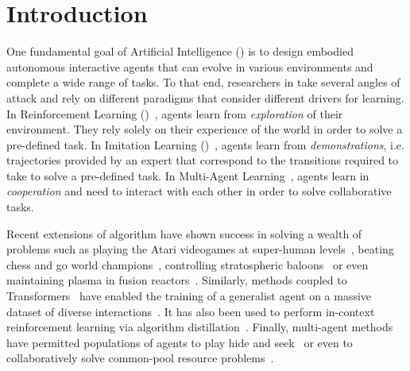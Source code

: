 
\chapter{Introduction}


\minitoc

One fundamental goal of Artificial Intelligence (\ai) is to design embodied autonomous interactive agents that can evolve in various environments and complete a wide range of tasks. To that end, researchers in \ai take several angles of attack and rely on different paradigms that consider different drivers for learning. In Reinforcement Learning (\rl)~\citep{sutton2018reinforcement}, agents learn from \textit{exploration} of their environment. They rely solely on their experience of the world in order to solve a pre-defined task. In Imitation Learning (\il)~\citep{pomerleau1991efficient}, agents learn from \textit{demonstrations}, i.e. trajectories provided by an expert that correspond to the transitions required to take to solve a pre-defined task.  In Multi-Agent Learning~\citep{LITTMAN1994157}, agents learn in \textit{cooperation} and need to interact with each other in order to solve collaborative tasks.


Recent extensions of \rl algorithm have shown success in solving a wealth of problems such as playing the Atari videogames at super-human levels~\citep{mnih2015human}, beating chess and go world champions~\citep{silver2016mastering}, controlling stratospheric baloons~\citep{bellemare2020autonomous} or even maintaining plasma in fusion reactors~\citep{degrave2022magnetic}. Similarly, \il methods coupled to Transformers~\citep{vaswani2017attention} have enabled the training of a generalist agent on a massive dataset of diverse interactions~\citep{reed2022a}. It has also been used to perform in-context reinforcement learning via algorithm distillation~\citep{laskin2022incontext}. Finally, multi-agent methods have permitted populations of agents to play hide and seek~\citep{Baker2020Emergent} or even to collaboratively solve common-pool resource problems~\citep{perolat2017commonpool}.

